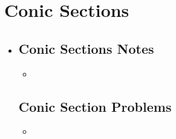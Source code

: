 \section{Conic Sections}
\begin{itemize}
  \item[]

  \subsection{Conic Sections Notes}
  \begin{itemize}
    \item
  \end{itemize}

  \subsection{Conic Section Problems}
  \begin{itemize}
    \item
  \end{itemize}

\end{itemize}
